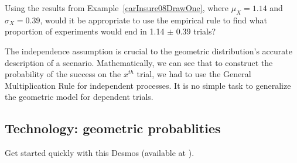 \begin{exercisewrap}
\begin{nexercise}
Using the results from Example~\ref{carInsure08DrawOne},
where $\mu_{\scriptscriptstyle{X}} = 1.14$
and $\sigma_{\scriptscriptstyle{X}} = 0.39$,
would it be appropriate
to use the empirical rule to find what proportion
of experiments would end in 1.14 $\pm$ 0.39 trials?\footnotemark{}
\end{nexercise}
\end{exercisewrap}

The independence assumption is crucial to the geometric
distribution's accurate description of a scenario.
Mathematically, we can see that to construct the probability
of the success on the $x^{th}$ trial, we had to use the
General Multiplication Rule for independent processes.
It is no simple task to generalize the geometric model
for dependent trials.



\subsection{Technology: geometric probablities}

\noindent Get started quickly with this Desmos  (\small{available at }).

\begin{center}
\end{center}


